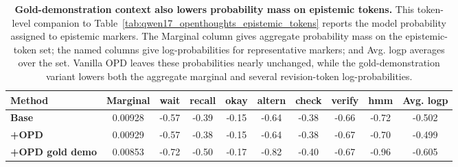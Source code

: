 \begin{table}[t]
\centering
\caption{\textbf{Gold-demonstration context also lowers probability mass on epistemic tokens.}
This token-level companion to Table~\ref{tab:qwen17_openthoughts_epistemic_tokens} reports the model probability assigned to epistemic markers. The Marginal column gives aggregate probability mass on the epistemic-token set; the named columns give log-probabilities for representative markers; and Avg. logp averages over the set. Vanilla OPD leaves these probabilities nearly unchanged, while the gold-demonstration variant lowers both the aggregate marginal and several revision-token log-probabilities.}
\label{tab:qwen17_openthoughts_epistemic_logprobs}
\scriptsize
\setlength{\tabcolsep}{2pt}
\renewcommand{\arraystretch}{1.12}

\begin{tabular*}{\textwidth}{@{\extracolsep{\fill}}lccccccccc@{}}
\toprule
\textbf{Method}
& \textbf{Marginal}
& \textbf{wait}
& \textbf{recall}
& \textbf{okay}
& \textbf{altern}
& \textbf{check}
& \textbf{verify}
& \textbf{hmm}
& \textbf{Avg. logp} \\
\midrule
\textbf{Base}
& 0.00928
& -0.57
& -0.39
& -0.15
& -0.64
& -0.38
& -0.66
& -0.72
& -0.502 \\
\textbf{+OPD}
& 0.00929
& -0.57
& -0.38
& -0.15
& -0.64
& -0.38
& -0.67
& -0.70
& -0.499 \\
\textbf{+OPD gold demo}
& 0.00853
& -0.72
& -0.50
& -0.17
& -0.82
& -0.40
& -0.67
& -0.96
& -0.605 \\
\bottomrule
\end{tabular*}
\end{table}
